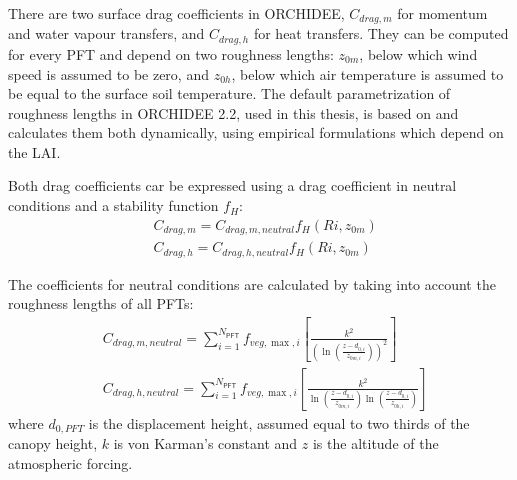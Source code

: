 There are two surface drag coefficients in ORCHIDEE, $C_{drag, m}$ for momentum and water vapour transfers, and $C_{drag, h}$ for heat transfers.
They can be computed for every PFT and depend on two roughness lengths: $z_{0m}$, below which wind speed is assumed to be zero, and $z_{0h}$, below which air temperature is assumed to be equal to the surface soil temperature. 
The default parametrization of roughness lengths in ORCHIDEE 2.2, used in this thesis, is based on \citet{su_evaluation_2001} and calculates them both dynamically, using empirical formulations which depend on the LAI. 

Both drag coefficients car be expressed using a drag coefficient in neutral conditions and a stability function $f_H$:
\begin{align}
    &C_{drag,m} = C_{drag,m,neutral} f_H(Ri, z_{0m})\\
    &C_{drag,h} = C_{drag,h,neutral} f_H(Ri, z_{0m})
\end{align}

The coefficients for neutral conditions are calculated by taking into account the roughness lengths of all PFTs:
\begin{align}
    &C_{drag,m,neutral} = \sum_{i=1}^{N_\mathsf{PFT}} f_{veg,\max,i} \left[ \frac{k^2}{\left(\ln\left(\frac{z-d_{0,i}}{z_{0m,i}}\right)\right)^2} \right]\\
    &C_{drag,h,neutral} = \sum_{i=1}^{N_\mathsf{PFT}} f_{veg,\max,i} \left[ \frac{k^2}{\ln\left(\frac{z-d_{0,i}}{z_{0m,i}}\right)\ln\left(\frac{z-d_{0,i}}{z_{0h,i}}\right)} \right]
\end{align}
where ${d_{0,PFT}}$ is the displacement height, assumed equal to two thirds of the canopy height, ${k}$ is von Karman's constant and $z$ is the altitude of the atmospheric forcing.

